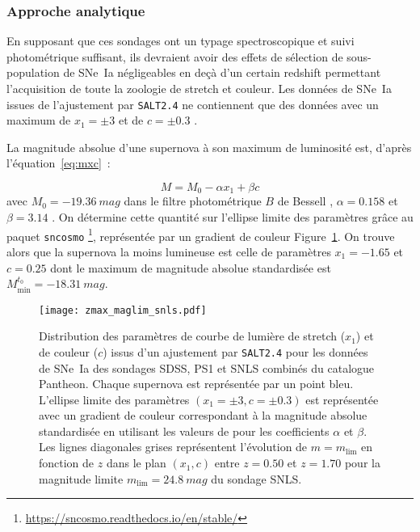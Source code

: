 \documentclass[../main/main.tex]{subfiles}
\begin{document}
\subsubsection{Approche analytique}\label{sssec:maglim}

En supposant que ces sondages ont un typage spectroscopique et suivi
photométrique suffisant, ils devraient avoir des effets de sélection de
sous-population de SNe~Ia négligeables en deçà d'un certain redshift permettant
l'acquisition de toute la zoologie de stretch et couleur. Les données de SNe~Ia
issues de l'ajustement par \texttt{SALT2.4} ne contiennent que des données avec
un maximum de $x_1 = \pm 3$ et de $c = \pm 0.3$ \citep[][cf
Section~\ref{ssec:salt}]{guy2007, betoule2014}.

La magnitude absolue d'une supernova à son maximum de luminosité est, d'après
l'équation~\ref{eq:mxc}~:

\begin{equation*}
    M = M_0 -\alpha x_1 + \beta c
\end{equation*}
avec $M_0 = \SI{-19.36}{mag}$ dans le filtre photométrique $B$ de Bessell
\citep{kessler2009a, scolnic2014}, $\alpha=0.158$ et $\beta=3.14$
\citep[Table 7,][]{scolnic2018}. On détermine cette quantité sur l'ellipse limite
des paramètres grâce au paquet \texttt{sncosmo}
\footnote{\href{https://sncosmo.readthedocs.io/en/stable/}
{https://sncosmo.readthedocs.io/en/stable/}}, représentée par un gradient de
couleur Figure~\ref{fig:maglim}. On trouve alors que la supernova la moins
lumineuse est celle de paramètres $x_1 = -1.65$ et $c = 0.25$ dont le maximum de
magnitude absolue standardisée est $M_{\min}^{t_0}=\SI{-18.31}{mag}$.

\begin{figure}
    \centering
    \texttt{[image: zmax\_maglim\_snls.pdf]}
    \caption{Distribution des paramètres de courbe de lumière de stretch ($x_1$)
        et de couleur ($c$) issus d'un ajustement par \texttt{SALT2.4} pour les
        données de SNe~Ia des sondages SDSS, PS1 et SNLS combinés du catalogue
        Pantheon. Chaque supernova est représentée par un point bleu. L'ellipse
        limite des paramètres $(x_1=\pm3, c=\pm0.3)$ est représentée avec un
        gradient de couleur correspondant à la magnitude absolue standardisée en
        utilisant les valeurs de \cite{scolnic2018} pour les coefficients
        $\alpha$ et $\beta$. Les lignes diagonales grises représentent
        l'évolution de $m = m_{\lim}$ en fonction de $z$ dans le plan $(x_1,c)$
        entre $z=0.50$ et $z=1.70$ pour la magnitude limite
    $m_{\lim}=\SI{24.8}{mag}$ du sondage SNLS.}
    \label{fig:maglim}
\end{figure}
\end{document}
